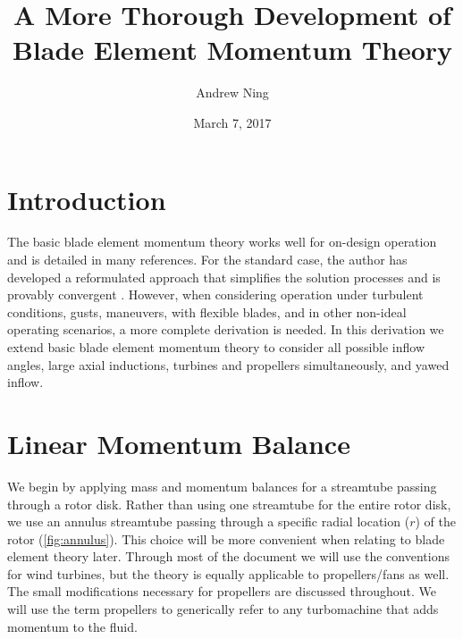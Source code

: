 \documentclass{article}
\begin{document}
\author{Andrew Ning}
\title{A More Thorough Development of\\Blade Element Momentum Theory}
\date{March 7, 2017}
\maketitle

\section{Introduction}

The basic blade element momentum theory works well for on-design operation and is detailed in many references.  For the standard case, the author has developed a reformulated approach that simplifies the solution processes and is provably convergent \cite{Ning2014b}.  However, when considering operation under turbulent conditions, gusts, maneuvers, with flexible blades, and in other non-ideal operating scenarios, a more complete derivation is needed.  In this derivation we extend basic blade element momentum theory to consider all possible inflow angles, large axial inductions, turbines and propellers simultaneously, and yawed inflow.

\section{Linear Momentum Balance}

We begin by applying mass and momentum balances for a streamtube passing through a rotor disk.  Rather than using one streamtube for the entire rotor disk, we use an annulus streamtube passing through a specific radial location ($r$) of the rotor (\cref{fig:annulus}). This choice will be more convenient when relating to blade element theory later.  Through most of the document we will use the conventions for wind turbines, but the theory is equally applicable to propellers/fans as well.  The small modifications necessary for propellers are discussed throughout.  We will use the term propellers to generically refer to any turbomachine that adds momentum to the fluid.
\end{document}
